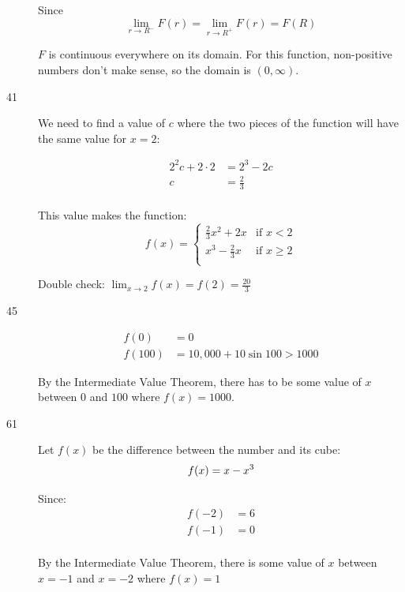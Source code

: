 \documentclass[letterpaper, landscape]{exam}
\begin{document}
\begin{description}
        Since
        \[
          \lim_{r \to R^-} F(r) = \lim_{r \to R^+} F(r) = F(R)
        \]

        $F$ is continuous everywhere on its domain. For this function, non-positive
        numbers don't make sense, so the domain is $(0, \infty)$.

      \item[41]
        We need to find a value of $c$ where the two pieces of the function will have the
        same value for $x = 2$:

        \begin{align*}
          2^2 c + 2 \cdot 2 & = 2^3 - 2c \\
          c                 & = \boxed{ \frac{2}{3} } \\
        \end{align*}

        This value makes the function:
        \[
          f(x) = 
            \begin{cases}
              \frac{2}{3} x^2 + 2x & \text{if } x < 2 \\
              x^3 - \frac{2}{3} x  & \text{if } x \geq 2 \\
            \end{cases}
        \]

        Double check: $\lim_{x \to 2} f(x) = f(2) = \frac{20}{3}$

      \item[45]
        \begin{align*}
          f(0) &= 0 \\
          f(100) &= 10,000 + 10 \sin 100 > 1000
        \end{align*}

        By the Intermediate Value Theorem, there has to be some value of $x$ between
        $0$ and $100$ where $f(x) = 1000$.

      \item[61]
        Let $f(x)$ be the difference between the number and its cube:
        \[
          f(x) = x - x^3  \\
        \]

        Since:
        \begin{align*}
          f(-2) &= 6 \\
          f(-1) &= 0 \\
        \end{align*}

        By the Intermediate Value Theorem, there is some value of $x$ between $x = -1$ and
        $x = -2$ where $f(x) = 1$


\end{description}
\end{document}
